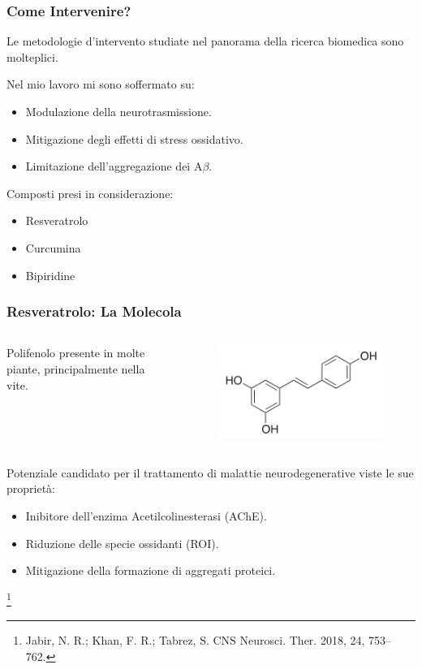 \documentclass[9pt]{beamer}
\newcommand\blfootnote[1]{%
	\begingroup
	\renewcommand\thefootnote{}\footnote{#1}%
	\addtocounter{footnote}{-1}%
	\endgroup
}
\begin{document}
\begin{frame}
	\frametitle{Come Intervenire?}
	Le metodologie d'intervento studiate nel panorama della ricerca biomedica sono molteplici.

	Nel mio lavoro mi sono soffermato su:
	\begin{itemize}
		\item Modulazione della neurotrasmissione.
		\item Mitigazione degli effetti di stress ossidativo.
		\item Limitazione dell'aggregazione dei A$\beta$.
	\end{itemize}

	Composti presi in considerazione:
	\begin{itemize}
		\item Resveratrolo %
		\item Curcumina
		\item Bipiridine
	\end{itemize}


\end{frame}


\begin{frame}
	\frametitle{Resveratrolo: La Molecola}
	\begin{columns}
		\begin{column}{0.5\textwidth}
			Polifenolo presente in molte piante, principalmente nella vite.
		\end{column}
		\begin{column}{0.5\textwidth}
			\begin{figure}
				\includegraphics[width=.8\textwidth]{immagini/resveratrolo.png}
			\end{figure}
		\end{column}
	\end{columns}
	\medskip


	Potenziale candidato per il trattamento di malattie neurodegenerative viste le sue proprietà:
	\begin{itemize}
		\item Inibitore dell'enzima Acetilcolinesterasi (AChE).
		\item Riduzione delle specie ossidanti (ROI).
		\item Mitigazione della formazione di aggregati proteici.
	\end{itemize}
	\blfootnote{Jabir, N. R.; Khan, F. R.; Tabrez, S. CNS Neurosci. Ther. 2018, 24, 753–762.}
\end{frame}
\end{document}
